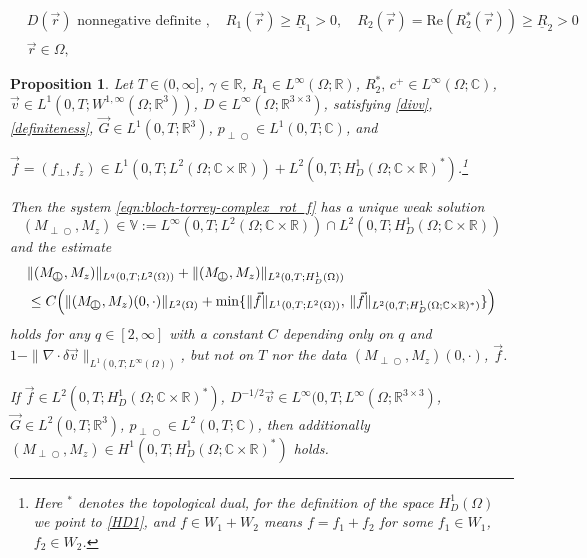 \documentclass[10pt,a4paper]{amsart}
\newtheorem{proposition}{Proposition}
\newcommand{\Margin}[1]{}
\def\Mpp{M_{\perp\!\!\!\!\!\bigcirc}}
\renewcommand\Re{\mathrm{Re}}
\def\pp{p_{\perp\!\!\!\!\!\bigcirc}}
\newcommand{\revision}[1]{{ #1}}
\begin{document}
\begin{equation}\label{definiteness}
\begin{aligned}
&D(\vec r)\text{ nonnegative definite }, \quad 
R_1(\vec r)\geq \underline{R}_1>0, \quad
R_2(\vec r)=\Re(R_2^*(\vec r))\geq \underline{R}_2>0\\
&\vec r\in\Omega,
\end{aligned}
\end{equation}

\begin{proposition}\label{prop:wellposed}
Let $T\in(0,\infty]$, $\gamma\in\mathbb{R}$, 
$R_1\in L^\infty(\Omega;\mathbb{R})$, $R_2^*,\, c^+\in L^\infty(\Omega;\mathbb{C})$, 
$\vec v\in L^1(0,T;W^{1,\infty}(\Omega;\mathbb{R}^3))$, 
$D\in L^\infty(\Omega;\mathbb{R}^{3\times 3})$, 
satisfying \eqref{divv}, \eqref{definiteness},
$\vec G\in L^1(0,T;\mathbb{R}^3)$, 
$\pp\in L^1(0,T;\mathbb{C})$, 
and 
\Margin{R2 6)}
$\revision{\vec{f}=(f_\perp,f_z)}\in L^1(0,T;L^2(\Omega;\mathbb{C}\times\mathbb{R}))+L^2(0,T;H_D^1(\Omega;\mathbb{C}\times\mathbb{R})^*)$.\footnote{Here ${}^*$ denotes the topological dual, for the definition of the space $H_D^1(\Omega)$ we point to \eqref{HD1}, and $f\in W_1+W_2$ means $f=f_1+f_2$ for some $f_1\in W_1$, $f_2\in W_2$.} 

Then the system 
\eqref{eqn:bloch-torrey-complex_rot_f}
has a unique weak solution
\begin{equation}\label{V_wellposed}
(\Mpp,M_z)\in \mathbb{V}:=L^\infty(0,T;L^2(\Omega;\mathbb{C}\times\mathbb{R}))\cap L^2(0,T;H_D^1(\Omega;\mathbb{C}\times\mathbb{R}))
\end{equation}
and the estimate 
\begin{equation}\label{enest_thm}
\begin{aligned}
&\|(\Mpp,M_z)\|_{L^q(0,T;L^2(\Omega))}
+\|(\Mpp,M_z)\|_{L^2(0,T;H_D^1(\Omega))}\\
&\leq C\Bigl(\|(\Mpp,M_z)(0, \cdot)\|_{L^2(\Omega)} + \min\{\|\revision{\vec{f}}\|_{L^1(0,T;L^2(\Omega))}, \,  \|\revision{\vec{f}}\|_{L^2(0,T;H_D^1(\Omega;\mathbb{C}\times\mathbb{R})^*)}\}\Bigr)
\end{aligned}
\end{equation}
holds for any $q\in[2,\infty]$ with a constant 
$C$ depending only on $q$ and $1-\|\nabla\cdot\delta{\vec v}\|_{L^1(0,T;L^\infty(\Omega))}$,
but not on $T$ nor the data $(\Mpp,M_z)(0, \cdot)$, $\revision{\vec{f}}$.

If 
$\revision{\vec{f}}\in L^2(0,T;H_D^1(\Omega;\mathbb{C}\times\mathbb{R})^*)$, 
$D^{-1/2}{\vec v}\in L^\infty(0,T;L^\infty(\Omega;\mathbb{R}^{3\times 3})$, 
$\vec G\in L^2(0,T;\mathbb{R}^3)$,
$\pp\in L^2(0,T;\mathbb{C})$, 
then additionally $(\Mpp,M_z)\in H^1(0,T;H_D^1(\Omega;\mathbb{C}\times\mathbb{R})^*)$ holds.
\end{proposition}
\end{document}

